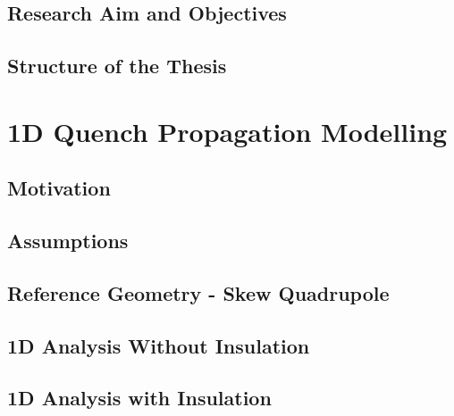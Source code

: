 \documentclass{article}
\begin{document}
\subsection{Research Aim and Objectives}


\subsection{Structure of the Thesis}


\clearpage
\section{1D Quench Propagation Modelling}
\label{section: 1d_quench_propagation_modelling}

\subsection{Motivation}
\label{subsection: 1d_quench_propagation_motivation}


\subsection{Assumptions}
\label{subsection: 1d_quench_propagation_assumptions}


\subsection{Reference Geometry - Skew Quadrupole}
\label{subsection: 1d_quench_propagation_geometry}


\subsection{1D Analysis Without Insulation}
\label{subsection: 1D_quench_propagation_no_insulation}


\subsection{1D Analysis with Insulation}
\label{subsection: 1D_quench_propagation_with_insulation}

\end{document}
